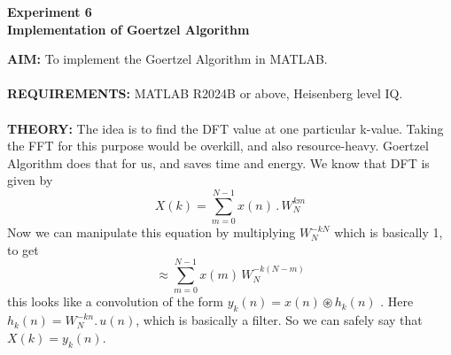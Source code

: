 \documentclass[12pt]{report}
\begin{document}
  \newpage
  \begin{center}
    \textbf{\LARGE Experiment 6} \\
    \vspace{0.2cm}
    \textbf{\large Implementation of Goertzel Algorithm}
  \end{center}
  \noindent \textbf{AIM:} To implement the Goertzel Algorithm in MATLAB. \\ \\
  \textbf{REQUIREMENTS:} MATLAB R2024B or above, Heisenberg level IQ. \\ \\
  \textbf{THEORY:} The idea is to find the DFT value at one particular k-value. Taking the FFT for this purpose would be overkill, and also resource-heavy. Goertzel Algorithm does that for us, and saves time and energy. We know that DFT is given by \[ X(k) = \sum_{m=0}^{N-1} x(n) \, . \, W_{N}^{km} \] Now we can manipulate this equation by multiplying $ W_{N}^{-kN} $ which is basically 1, to get \[ \approx \sum_{m = 0}^{N-1} x(m) \, W_{N}^{ -k (N - m)} \] this looks like a convolution of the form $y_k (n) = x(n) \circledast h_k (n) $ . Here $ h_k (n) = W_{N}^{-kn} . \, u(n) $, which is basically a filter. So we can safely say that $X(k) = y_k (n)$. \\ 
\end{document}
